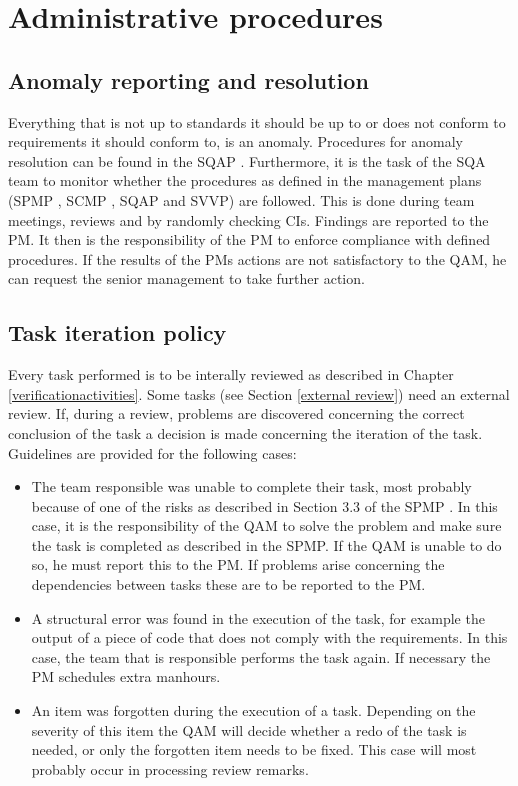 \chapter{Administrative procedures}
\section{Anomaly reporting and resolution}
Everything that is not up to standards it should be up to or does not conform to requirements it should conform to, is an anomaly. Procedures for anomaly resolution can be found in the SQAP \cite{sqap}. Furthermore, it is the task of the SQA team to monitor whether the procedures as defined in the management plans (SPMP \cite{spmp}, SCMP \cite{scmp}, SQAP \cite{sqap} and SVVP) are followed. This is done during team meetings, reviews and by randomly checking CIs. Findings are reported to the PM. It then is the responsibility of the PM to enforce compliance with defined procedures. If the results of the PMs actions are not satisfactory to the QAM, he can request the senior management to take further action.

\section{Task iteration policy}
    Every task performed is to be interally reviewed as described in Chapter \ref{verificationactivities}. Some tasks (see Section \ref{external review}) need an external review.  If, during a review, problems
    are discovered concerning the correct conclusion of the task a decision is made concerning the
    iteration of the task. Guidelines are provided for the following cases:
\begin{itemize}
\item The team responsible was unable to complete their task, most probably because of one of
          the risks as described in Section 3.3 of the SPMP \cite{spmp}. In this case, it is the responsibility
          of the QAM to solve the problem and make sure the task is completed as described in the
          SPMP. If the QAM is unable to do so, he must report this to the PM. If problems arise
          concerning the dependencies between tasks these are to be reported to the PM.
\item A structural error was found in the execution of the task, for example the output of a piece
          of code that does not comply with the requirements.
          In this case, the team that is responsible performs the task again. If necessary the PM
          schedules extra manhours.
\item An item was forgotten during the execution of a task.
          Depending on the severity of this item the QAM will decide whether a redo of the task is
          needed, or only the forgotten item needs to be fixed. This case will most probably occur in
          processing review remarks.
\end {itemize}
